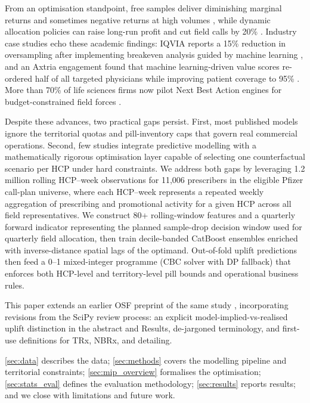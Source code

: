 From an optimisation standpoint, free samples deliver diminishing marginal returns and sometimes negative returns at high volumes \citep{JosephMantrala2009}, while dynamic allocation policies can raise long-run profit and cut field calls by 20\% \citep{MontoyaNetzerJedidi2010}. Industry case studies echo these academic findings: IQVIA reports a 15\% reduction in oversampling after implementing breakeven analysis guided by machine learning \citep{IQVIA2025}, and an Axtria engagement found that machine learning-driven value scores re-ordered half of all targeted physicians while improving patient coverage to 95\% \citep{Awadhwal2023}. More than 70\% of life sciences firms now pilot Next Best Action engines for budget-constrained field forces \citep{MulinariOzieranski2022}.

Despite these advances, two practical gaps persist. First, most published models ignore the territorial quotas and pill-inventory caps that govern real commercial operations. Second, few studies integrate predictive modelling with a mathematically rigorous optimisation layer capable of selecting one counterfactual scenario per HCP under hard constraints. We address both gaps by leveraging 1.2 million rolling HCP--week observations for 11,006 prescribers in the eligible Pfizer call-plan universe, where each HCP--week represents a repeated weekly aggregation of prescribing and promotional activity for a given HCP across all field representatives. We construct 80+ rolling-window features and a quarterly forward indicator representing the planned sample-drop decision window used for quarterly field allocation, then train decile-banded CatBoost ensembles enriched with inverse-distance spatial lags of the optimand. Out-of-fold uplift predictions then feed a 0--1 mixed-integer programme (CBC solver with DP fallback) that enforces both HCP-level and territory-level pill bounds and operational business rules.

This paper extends an earlier OSF preprint of the same study \citep{PlambeckPuleriGonzalez2025}, incorporating revisions from the SciPy review process: an explicit model-implied-vs-realised uplift distinction in the abstract and Results, de-jargoned terminology, and first-use definitions for TRx, NBRx, and detailing.

\cref{sec:data} describes the data; \cref{sec:methods} covers the modelling pipeline and territorial constraints; \cref{sec:mip_overview} formalises the optimisation; \cref{sec:stats_eval} defines the evaluation methodology; \cref{sec:results} reports results; and we close with limitations and future work.


